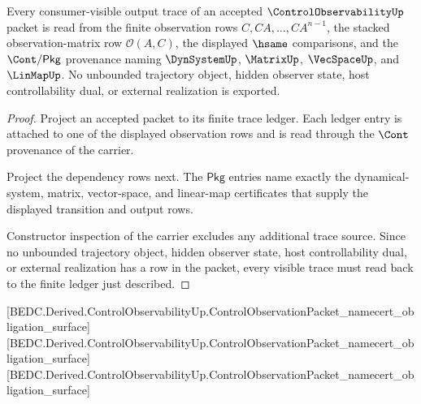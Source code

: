 \begin{theorem}
\label{thm:control-observability-ledger-readback}
Every consumer-visible output trace of an accepted $\ControlObservabilityUp$ packet is read from the finite observation rows $C,CA,\ldots,CA^{n-1}$, the stacked observation-matrix row $\mathcal O(A,C)$, the displayed $\hsame$ comparisons, and the $\Cont/\mathsf{Pkg}$ provenance naming $\DynSystemUp$, $\MatrixUp$, $\VecSpaceUp$, and $\LinMapUp$. No unbounded trajectory object, hidden observer state, host controllability dual, or external realization is exported.
\end{theorem}
\begin{proof}
Project an accepted packet to its finite trace ledger. Each ledger entry is attached to one of the displayed observation rows and is read through the $\Cont$ provenance of the carrier.

Project the dependency rows next. The $\mathsf{Pkg}$ entries name exactly the dynamical-system, matrix, vector-space, and linear-map certificates that supply the displayed transition and output rows.

Constructor inspection of the carrier excludes any additional trace source. Since no unbounded trajectory object, hidden observer state, host controllability dual, or external realization has a row in the packet, every visible trace must read back to the finite ledger just described.
\end{proof}

[BEDC.Derived.ControlObservabilityUp.ControlObservationPacket\_namecert\_obligation\_surface]
[BEDC.Derived.ControlObservabilityUp.ControlObservationPacket\_namecert\_obligation\_surface]
[BEDC.Derived.ControlObservabilityUp.ControlObservationPacket\_namecert\_obligation\_surface]

